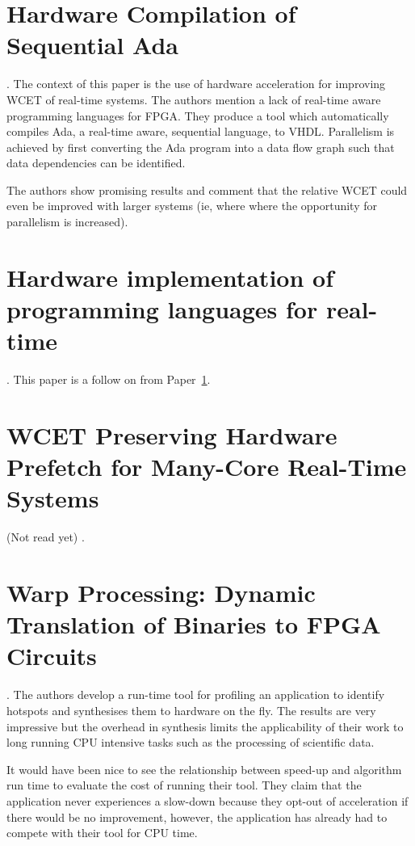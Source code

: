 \documentclass[10pt]{article}
\begin{document}
\maketitle




\section{Hardware Compilation of Sequential Ada}\label{sec:aud_ada}
\cite{aud_ada}. The context of this paper is the use of hardware acceleration for improving WCET of real-time systems.
The authors mention a lack of real-time aware programming languages for FPGA. They produce a tool which
automatically compiles Ada, a real-time aware, sequential language, to VHDL. Parallelism is achieved
by first converting the Ada program into a data flow graph such that data dependencies can be identified.

The authors show promising results and comment that the relative WCET could even be improved with
larger systems (ie, where where the opportunity for parallelism is increased).

\section{Hardware implementation of programming languages for real-time}
\cite{aud_hardimp}. This paper is a follow on from Paper~\ref{sec:aud_ada}.


\section{WCET Preserving Hardware Prefetch for Many-Core Real-Time Systems}
(Not read yet) \cite{aud_prefetch}.

\section{Warp Processing: Dynamic Translation of Binaries to FPGA Circuits}
\cite{warp}. The authors develop a run-time tool for profiling an application to identify hotspots and synthesises them
to hardware on the fly. The results are very impressive but the overhead in synthesis limits the applicability
of their work to long running CPU intensive tasks such as the processing of scientific data.

It would have been nice to see the relationship between speed-up and algorithm run time to evaluate the
cost of running their tool. They claim that the application never experiences a slow-down because they
opt-out of acceleration if there would be no improvement, however, the application has already had
to compete with their tool for CPU time.
\end{document}
